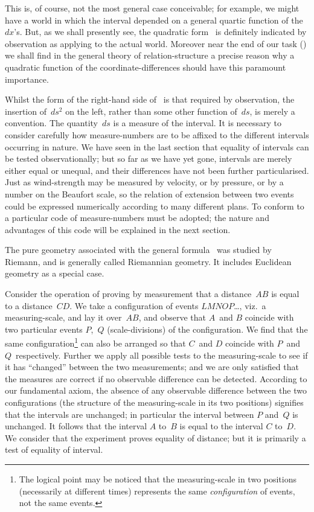 \documentclass[12pt]{book}
\begin{document}
This is, of course, not the most general case conceivable; for example, we
might have a world in which the interval depended on a general quartic
function of the~$dx$'s. But, as we shall presently see, the quadratic form~ is
definitely indicated by observation as applying to the actual world. Moreover
near the end of our task () we shall find in the general theory of relation\hyp{}structure
a precise reason why a quadratic function of the coordinate\hyp{}differences
should have this paramount importance.

Whilst the form of the right-hand side of~ is that required by
observation, the insertion of~$ds^2$ on the left, rather than some other function
of~$ds$, is merely a convention. The quantity~$ds$ is a measure of the interval.
%
%
It is necessary to consider carefully how measure\hyp{}numbers are to be affixed
to the different intervals occurring in nature. We have seen in the last
section that equality of intervals can be tested observationally; but so far
as we have yet gone, intervals are merely either equal or unequal, and their
differences have not been further particularised. Just as wind-strength may
be measured by velocity, or by pressure, or by a number on the Beaufort
scale, so the relation of extension between two events could be expressed
numerically according to many different plans. To conform to~ a
particular code of measure\hyp{}numbers must be adopted; the nature and
advantages of this code will be explained in the next section.

The pure geometry associated with the general formula~ was studied
by Riemann, and is generally called Riemannian geometry. It includes
%
%
Euclidean geometry as a special case.


Consider the operation of proving by measurement that a distance~$AB$ is
equal to a distance~$CD$. We take a configuration of events $LMNOP$\dots, viz.\ a
measuring\hyp{}scale, and lay it over~$AB$, and observe that $A$~and $B$ coincide with
two particular events $P$,~$Q$ (scale\hyp{}divisions) of the configuration. We find
that the same configuration\footnote
  {The logical point may be noticed that the measuring\hyp{}scale in two positions (necessarily at
  different times) represents the same \emph{configuration} of events, not the same events.}
can also be arranged so that $C$~and $D$ coincide
with $P$~and $Q$~respectively. Further we apply all possible tests to the
measuring\hyp{}scale to see if it has ``changed'' between the two measurements;
and we are only satisfied that the measures are correct if no observable
difference can be detected. According to our fundamental axiom, the absence
of any observable difference between the two configurations (the structure of
the measuring\hyp{}scale in its two positions) signifies that the intervals are unchanged;
in particular the interval between $P$ and~$Q$ is unchanged. It follows
that the interval $A$ to~$B$ is equal to the interval $C$ to~$D$. We consider that the
experiment proves equality of distance; but it is primarily a test of equality
of interval.
\end{document}
